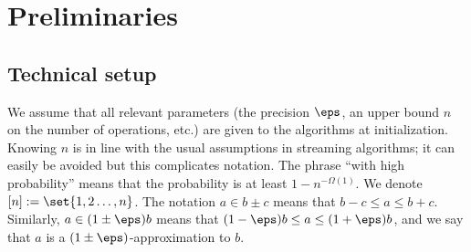 \section{Preliminaries}
\label{sec:preliminaries}
%
\subsection{Technical setup}
We assume that all relevant parameters (the precision $\eps$, an upper bound $n$ on the number of operations, etc.) are given to the algorithms at initialization. Knowing $n$ is in line with the usual assumptions in streaming algorithms; it can easily be avoided but this complicates notation. The phrase ``with high probability'' means that the probability is at least $1 - n^{-\Omega(1)}$.
%
We denote $[n] := \set{1, 2 \dots, n}$. The notation $a \in b \pm c$ means that $b-c \leq a \leq b + c$. Similarly, $a \in (1 \pm \eps) b$ means that $(1-\eps)b \leq a \leq (1 + \eps)b$, and we say that $a$ is a $(1\pm\eps)$-approximation to $b$.
%
